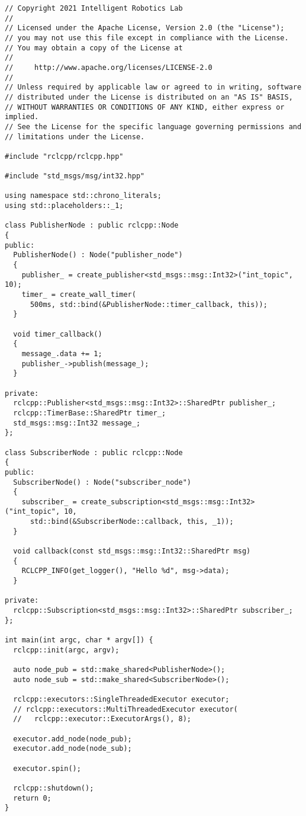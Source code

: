  \footnotesize
\begin{tcolorbox}[sharp corners, colframe=gray!80, colback=LightGray, left=0pt, top=0pt, bottom=0pt, title=\texttt{br2\_basics/src/executors.cpp}]
  \begin{verbatim}
// Copyright 2021 Intelligent Robotics Lab
//
// Licensed under the Apache License, Version 2.0 (the "License");
// you may not use this file except in compliance with the License.
// You may obtain a copy of the License at
//
//     http://www.apache.org/licenses/LICENSE-2.0
//
// Unless required by applicable law or agreed to in writing, software
// distributed under the License is distributed on an "AS IS" BASIS,
// WITHOUT WARRANTIES OR CONDITIONS OF ANY KIND, either express or implied.
// See the License for the specific language governing permissions and
// limitations under the License.

#include "rclcpp/rclcpp.hpp"  

#include "std_msgs/msg/int32.hpp"

using namespace std::chrono_literals;
using std::placeholders::_1;

class PublisherNode : public rclcpp::Node
{
public:
  PublisherNode() : Node("publisher_node")
  {
    publisher_ = create_publisher<std_msgs::msg::Int32>("int_topic", 10);
    timer_ = create_wall_timer(
      500ms, std::bind(&PublisherNode::timer_callback, this));
  }

  void timer_callback()
  {
    message_.data += 1;
    publisher_->publish(message_);
  }

private:
  rclcpp::Publisher<std_msgs::msg::Int32>::SharedPtr publisher_;
  rclcpp::TimerBase::SharedPtr timer_;
  std_msgs::msg::Int32 message_;
};

class SubscriberNode : public rclcpp::Node
{
public:
  SubscriberNode() : Node("subscriber_node")
  {
    subscriber_ = create_subscription<std_msgs::msg::Int32>("int_topic", 10,
      std::bind(&SubscriberNode::callback, this, _1));
  }

  void callback(const std_msgs::msg::Int32::SharedPtr msg)
  {
    RCLCPP_INFO(get_logger(), "Hello %d", msg->data);
  }

private:
  rclcpp::Subscription<std_msgs::msg::Int32>::SharedPtr subscriber_;
};

int main(int argc, char * argv[]) { 
  rclcpp::init(argc, argv);  

  auto node_pub = std::make_shared<PublisherNode>();
  auto node_sub = std::make_shared<SubscriberNode>();

  rclcpp::executors::SingleThreadedExecutor executor;
  // rclcpp::executors::MultiThreadedExecutor executor(
  //   rclcpp::executor::ExecutorArgs(), 8);

  executor.add_node(node_pub);
  executor.add_node(node_sub);

  executor.spin();

  rclcpp::shutdown();  
  return 0;  
}    \end{verbatim}
    \end{tcolorbox}
  \normalsize

